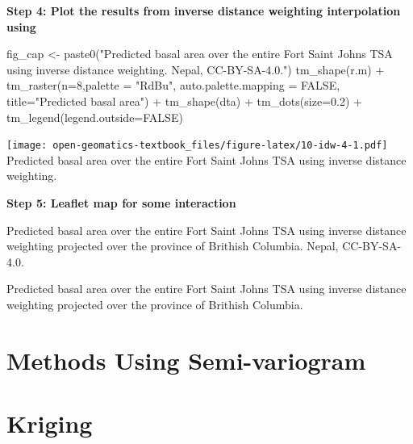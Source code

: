 \documentclass[
]{book}
\newenvironment{Shaded}{\begin{snugshade}}{\end{snugshade}}
\newcommand{\AttributeTok}[1]{\textcolor[rgb]{0.77,0.63,0.00}{#1}}
\newcommand{\ConstantTok}[1]{\textcolor[rgb]{0.00,0.00,0.00}{#1}}
\newcommand{\DecValTok}[1]{\textcolor[rgb]{0.00,0.00,0.81}{#1}}
\newcommand{\FloatTok}[1]{\textcolor[rgb]{0.00,0.00,0.81}{#1}}
\newcommand{\FunctionTok}[1]{\textcolor[rgb]{0.00,0.00,0.00}{#1}}
\newcommand{\NormalTok}[1]{#1}
\newcommand{\OtherTok}[1]{\textcolor[rgb]{0.56,0.35,0.01}{#1}}
\newcommand{\SpecialCharTok}[1]{\textcolor[rgb]{0.00,0.00,0.00}{#1}}
\newcommand{\StringTok}[1]{\textcolor[rgb]{0.31,0.60,0.02}{#1}}
\begin{document}
\textbf{Step 4: Plot the results from inverse distance weighting interpolation using}

\begin{Shaded}
\begin{Highlighting}[]
\NormalTok{fig\_cap }\OtherTok{\textless{}{-}} \FunctionTok{paste0}\NormalTok{(}\StringTok{"Predicted basal area over the entire Fort Saint Johns TSA using inverse distance weighting. Nepal, CC{-}BY{-}SA{-}4.0."}\NormalTok{)}
\FunctionTok{tm\_shape}\NormalTok{(r.m) }\SpecialCharTok{+} 
  \FunctionTok{tm\_raster}\NormalTok{(}\AttributeTok{n=}\DecValTok{8}\NormalTok{,}\AttributeTok{palette =} \StringTok{"RdBu"}\NormalTok{, }\AttributeTok{auto.palette.mapping =} \ConstantTok{FALSE}\NormalTok{,}
            \AttributeTok{title=}\StringTok{"Predicted basal area"}\NormalTok{) }\SpecialCharTok{+} 
  \FunctionTok{tm\_shape}\NormalTok{(dta) }\SpecialCharTok{+} \FunctionTok{tm\_dots}\NormalTok{(}\AttributeTok{size=}\FloatTok{0.2}\NormalTok{) }\SpecialCharTok{+}
  \FunctionTok{tm\_legend}\NormalTok{(}\AttributeTok{legend.outside=}\ConstantTok{FALSE}\NormalTok{)}
\end{Highlighting}
\end{Shaded}

\texttt{[image: open-geomatics-textbook\_files/figure-latex/10-idw-4-1.pdf]}
Predicted basal area over the entire Fort Saint Johns TSA using inverse distance weighting.

\textbf{Step 5: Leaflet map for some interaction}

\label{fig:10-idw-5}Predicted basal area over the entire Fort Saint Johns TSA using inverse distance weighting projected over the province of Brithish Columbia. Nepal, CC-BY-SA-4.0.

Predicted basal area over the entire Fort Saint Johns TSA using inverse distance weighting projected over the province of Brithish Columbia.

\hypertarget{methods-using-semi-variogram}{%
\section{Methods Using Semi-variogram}\label{methods-using-semi-variogram}}

\hypertarget{kriging}{%
\section{Kriging}\label{kriging}}
\end{document}
